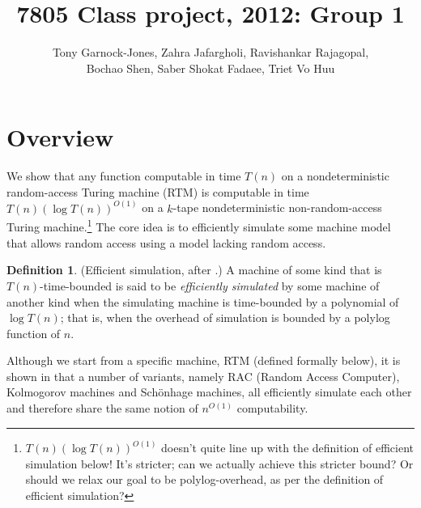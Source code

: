 \documentclass[english]{article}
\theoremstyle{plain}
\theoremstyle{definition}
\newtheorem{defn}[thm]{Definition}
\theoremstyle{plain}
\begin{document}
\title{7805 Class project, 2012: Group 1}
\author{
  Tony Garnock-Jones,
  Zahra Jafargholi,
  Ravishankar Rajagopal,\\
  Bochao Shen,
  Saber Shokat Fadaee,
  Triet Vo Huu
}
\maketitle

\section{Overview}

We show that any function computable in time $T(n)$ on a
nondeterministic random-access Turing machine (RTM) is computable in
time $T(n)(\log T(n))^{O(1)}$ on a $k$-tape nondeterministic
non-random-access Turing machine.\footnote{$T(n)(\log T(n))^{O(1)}$
  doesn't quite line up with the definition of efficient simulation
  below! It's stricter; can we actually achieve this stricter bound?
  Or should we relax our goal to be polylog-overhead, as per the
  definition of efficient simulation?}
The core idea is to efficiently simulate some machine model that
allows random access using a model lacking random access.

\begin{defn}

  (Efficient simulation, after \cite{DBLP:conf/ershov/GurevichS89}.) A
  machine of some kind that is $T(n)$-time-bounded is said to be
  \emph{efficiently simulated} by some machine of another kind when
  the simulating machine is time-bounded by a polynomial of $\log
  T(n)$; that is, when the overhead of simulation is bounded by a
  polylog function of $n$.
\end{defn}

Although we start from a specific machine, RTM (defined formally
below), it is shown in \cite{DBLP:conf/ershov/GurevichS89} that a
number of variants, namely RAC (Random Access Computer), Kolmogorov
machines and Sch\"{o}nhage machines, all efficiently simulate each
other and therefore share the same notion of $n^{O(1)}$ computability.
\end{document}
